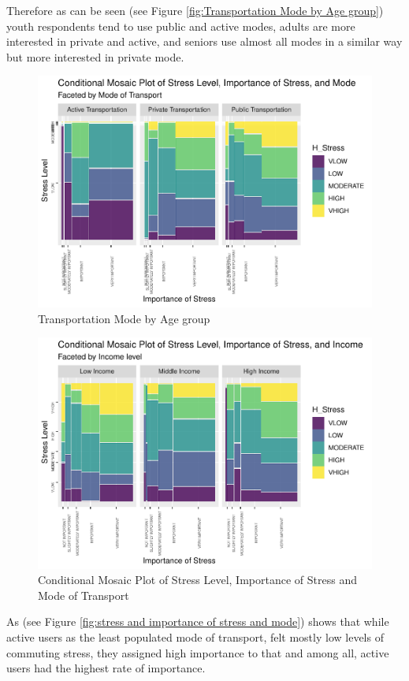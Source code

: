 \documentclass[
11pt, %
oneside, %
english, %
singlespacing, %
]{macthesis} %
\begin{document}
Therefore as can be seen (see Figure \ref{fig:Transportation Mode by Age group}) youth respondents tend to use public and active modes, adults are more interested in private and active, and seniors use almost all modes in a similar way but more interested in private mode.
\begin{figure}
\includegraphics[width=0.85\linewidth]{thesis_files/figure-latex/unnamed-chunk-26-1} \caption{\label{fig:Transportation Mode by Age group}Transportation Mode by Age group}\label{fig:unnamed-chunk-26}
\end{figure}
\begin{figure}
\includegraphics[width=0.85\linewidth]{thesis_files/figure-latex/unnamed-chunk-27-1} \caption{\label{fig:stress and importance of stress and mode}Conditional Mosaic Plot of Stress Level, Importance of Stress and Mode of Transport}\label{fig:unnamed-chunk-27}
\end{figure}
As (see Figure \ref{fig:stress and importance of stress and mode}) shows that while active users as the least populated mode of transport, felt mostly low levels of commuting stress, they assigned high importance to that and among all, active users had the highest rate of importance.
\end{document}

